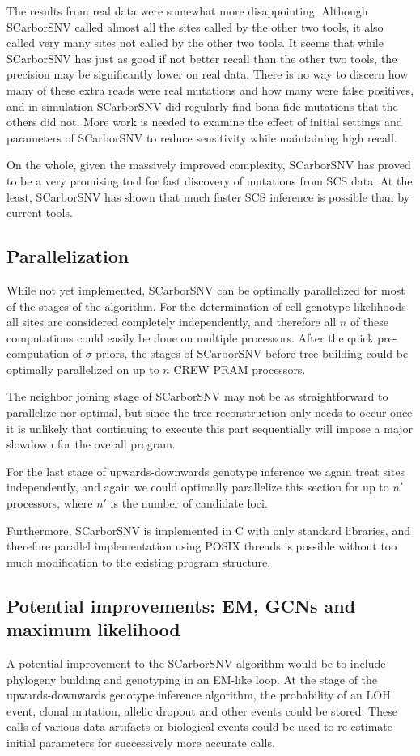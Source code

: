 \documentclass[../main.tex]{subfiles}
\begin{document}
The results from real data were somewhat more disappointing.
Although SCarborSNV called almost all the sites called by the other two tools, it also called very many sites not called by the other two tools.
It seems that while SCarborSNV has just as good if not better recall than the other two tools, the precision may be significantly lower on real data.
There is no way to discern how many of these extra reads were real mutations and how many were false positives, and in simulation SCarborSNV did regularly find bona fide mutations that the others did not.
More work is needed to examine the effect of initial settings and parameters of SCarborSNV to reduce sensitivity while maintaining high recall.

On the whole, given the massively improved complexity, SCarborSNV has proved to be a very promising tool for fast discovery of mutations from SCS data.
At the least, SCarborSNV has shown that much faster SCS inference is possible than by current tools.

\subsection{Parallelization}
While not yet implemented, SCarborSNV can be optimally parallelized for most of the stages of the algorithm.
For the determination of cell genotype likelihoods all sites are considered completely independently, and therefore all $n$ of these computations could easily be done on multiple processors.
After the quick pre-computation of $\sigma$ priors, the stages of SCarborSNV before tree building could be optimally parallelized on up to $n$ CREW PRAM processors.

The neighbor joining stage of SCarborSNV may not be as straightforward to parallelize nor optimal, but since the tree reconstruction only needs to occur once it is unlikely that continuing to execute this part sequentially will impose a major slowdown for the overall program.

For the last stage of upwards-downwards genotype inference we again treat sites independently, and again we could optimally parallelize this section for up to $n'$ processors, where $n'$ is the number of candidate loci.

Furthermore, SCarborSNV is implemented in C with only standard libraries, and therefore parallel implementation using POSIX threads is possible without too much modification to the existing program structure.

\subsection{Potential improvements: EM, GCNs and maximum likelihood}
A potential improvement to the SCarborSNV algorithm would be to include phylogeny building and genotyping in an EM-like loop.
At the stage of the upwards-downwards genotype inference algorithm, the probability of an LOH event, clonal mutation, allelic dropout and other events could be stored.
These calls of various data artifacts or biological events could be used to re-estimate initial parameters for successively more accurate calls.
\end{document}
